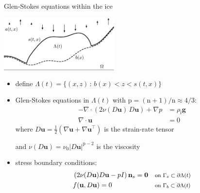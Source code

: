 \documentclass[10pt,svgnames]{beamer}
\newcommand{\bg}{\mathbf{g}}
\newcommand{\bn}{\mathbf{n}}
\newcommand{\bu}{\mathbf{u}}
\newcommand{\bzero}{\bm{0}}
\newcommand{\nn}{\mathrm{n}}
\newcommand{\pp}{\mathrm{p}}
\newcommand{\grad}{\nabla}
\newcommand{\rhoi}{\rho_{\text{i}}}
\newcommand{\where}[1]{\text{\footnotesize #1}}
\begin{document}
\begin{frame}{Glen-Stokes equations within the ice}

\hfill \includegraphics[width=0.45\textwidth]{stokesdomain.png}

\begin{itemize}
\item define ${\displaystyle \Lambda(t) = \{(x,z)\,:\,b(x)<z<s(t,x)\}}$
\item Glen-Stokes equations in $\Lambda(t)$ with $\pp = (\nn + 1)/\nn \approx 4/3$:
\begin{align*}
- \nabla \cdot \left(2 \nu(D\bu)\, D\bu\right) + \nabla p &= \rhoi \bg  \\
\nabla \cdot \bu &= 0
\end{align*}
where $D\bu = \frac{1}{2}\left(\grad\bu + \grad\bu^\top\right)$ is the strain-rate tensor

and $\nu(D\bu) = \nu_0 |D\bu|^{\pp-2}$ is the viscosity
\item stress boundary conditions:
\begin{align*}
&\left(2 \nu(D\bu) D\bu - pI\right) \bn_s = \bzero   && \where{on $\Gamma_s \subset \partial\Lambda(t)$} \\
&f(\bu,D\bu)=0 && \where{on $\Gamma_b \subset \partial\Lambda(t)$}
\end{align*}
\end{itemize}
\end{frame}


\newcommand{\stdblock}{
\begin{align*}
s - b &\ge 0 & &\where{in $\Omega$} \\
\frac{\partial s}{\partial t} - \bu|_s \cdot \bn_s - a &\ge 0 \\
(s - b) \left(\frac{\partial s}{\partial t} - \bu|_s \cdot \bn_s - a\right) &= 0 \\
- \nabla \cdot \left(2 \nu_0 |D\bu|^{\pp-2}\, D\bu\right) + \nabla p &= \rhoi \bg && \where{in $\Lambda(t)$} \\
\nabla \cdot \bu &= 0 \\
\left(2 \nu_0 |D\bu|^{\pp-2} D\bu - pI\right) \bn_s &= \bzero && \where{on $\Gamma_s \subset \partial\Lambda(t)$} \\
f(\bu,D\bu) &= 0 && \where{on $\Gamma_b \subset \partial\Lambda(t)$}
\end{align*}
}
\end{document}

